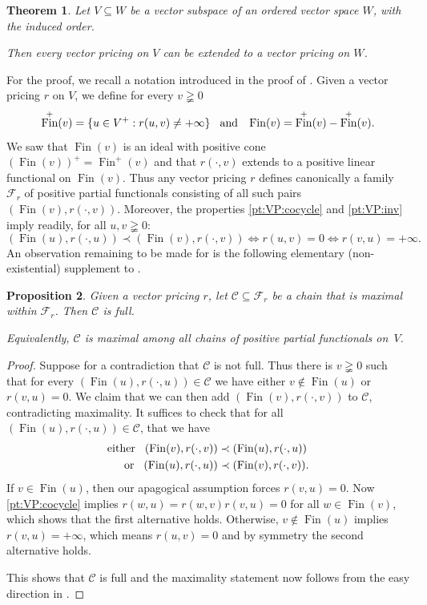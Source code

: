 \documentclass[11pt]{amsart}
\numberwithin{equation}{section}
\newtheorem{thm}{Theorem}[section]
\newtheorem{prop}[thm]{Proposition}
\theoremstyle{definition}
\theoremstyle{definition}
\newcommand*{\sC}{\mathscr{C}}
\newcommand*{\sF}{\mathscr{F}}
\newcommand*{\se}{\subseteq}
\DeclareMathOperator{\finite}{Fin}
\begin{document}
\begin{thm}\label{thm:VP:extend}
Let $V\se W$ be a vector subspace of an ordered vector space $W$, with the induced order.

Then every vector pricing on $V$ can be extended to a vector pricing on $W$.
\end{thm}

For the proof, we recall a notation introduced in the proof of . Given a vector pricing $r$ on $V$, we define for every $v\gneqq 0$
\begin{equation*}
\finite^+(v)=\{ u\in V^+ : r(u, v) \neq +\infty \}\kern3mm\text{and}\kern3mm \finite(v) = \finite^+(v) - \finite^+(v).
\end{equation*}
We saw that $\finite(v)$ is an ideal with positive cone $(\finite(v))^+= \finite^+(v)$ and that $r(\cdot, v)$ extends to a positive linear functional on $\finite(v)$. Thus any vector pricing $r$ defines canonically a family $\sF_r$ of positive partial functionals consisting of all such pairs $(\finite(v), r(\cdot, v))$. Moreover, the properties \ref{pt:VP:cocycle} and \ref{pt:VP:inv} imply readily, for all $u,v\gneqq 0$:
\begin{equation*}
(\finite(u), r(\cdot, u)) \prec (\finite(v), r(\cdot, v)) \Longleftrightarrow r(u, v) = 0  \Longleftrightarrow r(v,u) = +\infty.%
\end{equation*}
An observation remaining to be made for  is the following elementary (non-existential) supplement to .

\begin{prop}\label{prop:max-chain-Fr}
Given a vector pricing $r$, let $\sC\se \sF_r$ be a chain that is maximal within $\sF_r$. Then $\sC$ is full.

Equivalently, $\sC$ is maximal among all chains of positive partial functionals on~$V$.
\end{prop}

\begin{proof}
Suppose for a contradiction that $\sC$ is not full. Thus there is $v\gneqq 0$ such that for every $(\finite(u), r(\cdot, u)) \in \sC$ we have either $v\notin \finite(u)$ or $r(v,u)=0$. We claim that we can then add $(\finite(v), r(\cdot, v))$ to $\sC$, contradicting maximality. It suffices to check that for all $(\finite(u), r(\cdot, u)) \in \sC$, that we have
\begin{align*}
\text{either}  \kern3mm (\finite(v), r(\cdot, v)) &\prec (\finite(u), r(\cdot, u))\\
%
\text{or} \kern3mm  (\finite(u), r(\cdot, u)) &\prec (\finite(v), r(\cdot, v)).
\end{align*}
If $v\in \finite(u)$, then our apagogical assumption forces $r(v,u)=0$. Now \ref{pt:VP:cocycle} implies $r(w,u)=r(w,v) r(v,u)= 0$ for all $w\in \finite(v)$, which shows that the first alternative holds. Otherwise, $v\notin  \finite(u)$ implies $r(v, u)=+\infty$, which means $r(u,v)=0$ and by symmetry the second alternative holds.

This shows that $\sC$ is full and the maximality statement now follows from the easy direction in .
\end{proof}
\end{document}
